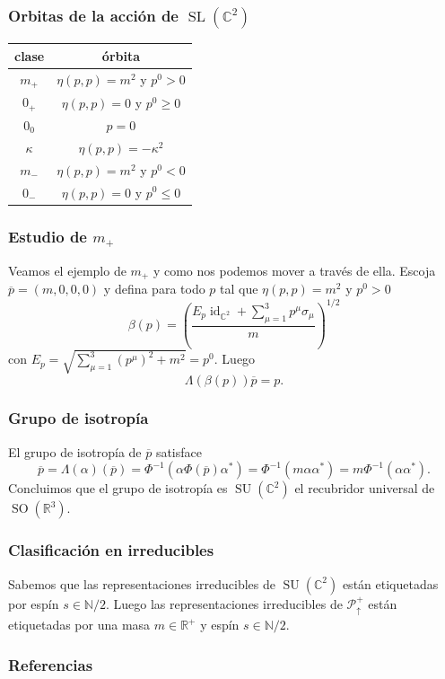 \documentclass{beamer}
\DeclareMathOperator{\SL}{SL}
\DeclareMathOperator{\id}{id}
\DeclareMathOperator{\SU}{SU}
\DeclareMathOperator{\SO}{SO}
\begin{document}
\begin{frame}
\frametitle{Orbitas de la acción de $\SL(\mathbb{C}^2)$}
\cite{Haag1992}
\begin{center}
\begin{tabular}{|c|c|}
\hline
clase & órbita \\
\hline
$m_+$ & $\eta(p,p)=m^2$ y $p^0>0$ \\
$0_+$ & $\eta(p,p)=0$ y $p^0\geq 0 $ \\
$0_0$ & $p=0$ \\
$\kappa$ & $\eta(p,p)=-\kappa^2$ \\
$m_-$ & $\eta(p,p)=m^2$ y $p^0<0$ \\
$0_-$ & $\eta(p,p)=0$ y $p^0\leq 0$ \\
\hline
\end{tabular}
\end{center}
\end{frame}

\begin{frame}
\frametitle{Estudio de $m_+$}
Veamos el ejemplo de $m_+$ y como nos podemos mover a través de ella. Escoja $\overline{p}=(m,0,0,0)$ y defina para todo $p$ tal que $\eta(p,p)=m^2$ y $p^0>0$
\begin{equation}
\beta(p)=\left(\frac{E_p\id_{\mathbb{C}^2}+\sum_{\mu=1}^3p^\mu\sigma_\mu}{m}\right)^{1/2}
\end{equation}
con $E_p=\sqrt{\sum_{\mu=1}^3(p^\mu)^2+m^2}=p^0$. Luego 
\begin{equation}
\Lambda(\beta(p))\overline{p} = p.
\end{equation}
\end{frame}

\begin{frame}
\frametitle{Grupo de isotropía}
El grupo de isotropía de $\overline{p}$ satisface
\begin{equation}
\overline{p} = \Lambda(\alpha)(\overline{p}) = \Phi^{-1}(\alpha\Phi(\overline{p})\alpha^*) = \Phi^{-1}(m\alpha\alpha^*)=m\Phi^{-1}(\alpha\alpha^*).
\end{equation} 
Concluimos que el grupo de isotropía es $\SU(\mathbb{C}^2)$ el recubridor universal de $\SO(\mathbb{R}^3)$.
\end{frame}

\begin{frame}
\frametitle{Clasificación en irreducibles}
Sabemos que las representaciones irreducibles de $\SU(\mathbb{C}^2)$ están etiquetadas por espín $s\in\mathbb{N}/2$\cite{Hall2013}. Luego las representaciones irreducibles de $\mathcal{P}^+_\uparrow$ están etiquetadas por una masa $m\in\mathbb{R}^+$ y espín $s\in\mathbb{N}/2$.
\end{frame}

\begin{frame}
\frametitle{Referencias}


\end{frame}
\end{document}

